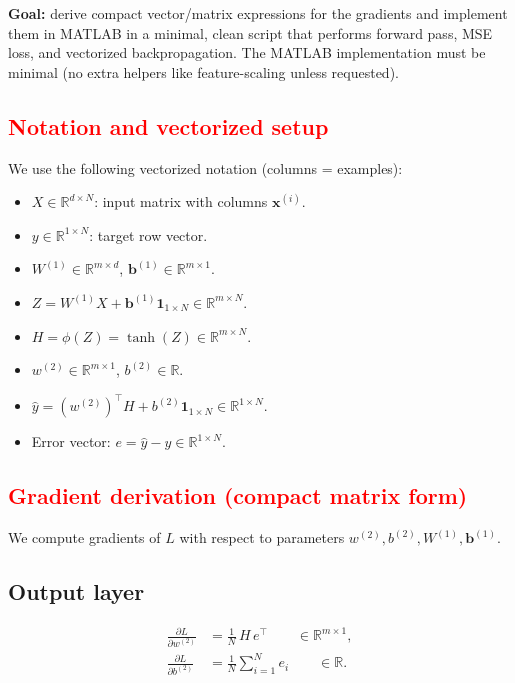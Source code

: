 \documentclass[11pt,a4paper]{article}
\begin{document}
\textbf{Goal:} derive compact vector/matrix expressions for the gradients and implement them in MATLAB in a minimal, clean script that performs forward pass, MSE loss, and vectorized backpropagation. The MATLAB implementation must be minimal (no extra helpers like feature-scaling unless requested).

\subsection{\textcolor{red}{Notation and vectorized setup}}
We use the following vectorized notation (columns = examples):

\begin{itemize}
  \item $X \in \mathbb{R}^{d\times N}$: input matrix with columns $\mathbf{x}^{(i)}$.
  \item $y \in \mathbb{R}^{1\times N}$: target row vector.
  \item $W^{(1)} \in \mathbb{R}^{m\times d}$, $\mathbf{b}^{(1)}\in\mathbb{R}^{m\times 1}$.
  \item $Z = W^{(1)}X + \mathbf{b}^{(1)}\mathbf{1}_{1\times N}\in\mathbb{R}^{m\times N}$.
  \item $H = \phi(Z)=\tanh(Z)\in\mathbb{R}^{m\times N}$.
  \item $w^{(2)}\in\mathbb{R}^{m\times 1}$, $b^{(2)}\in\mathbb{R}$.
  \item $\hat{y} = (w^{(2)})^\top H + b^{(2)}\mathbf{1}_{1\times N}\in\mathbb{R}^{1\times N}.$
  \item Error vector: $e = \hat{y} - y \in \mathbb{R}^{1\times N}.$
\end{itemize}

\subsection{\textcolor{red}{Gradient derivation (compact matrix form)}}
We compute gradients of $L$ with respect to parameters $w^{(2)}, b^{(2)}, W^{(1)}, \mathbf{b}^{(1)}$.

\subsection*{Output layer}
\[
\begin{aligned}
\frac{\partial L}{\partial w^{(2)}}
&= \frac{1}{N}\, H\, e^\top \qquad\in\mathbb{R}^{m\times 1},\\[6pt]
\frac{\partial L}{\partial b^{(2)}}
&= \frac{1}{N}\sum_{i=1}^N e_i \qquad\in\mathbb{R}.
\end{aligned}
\]
\end{document}
